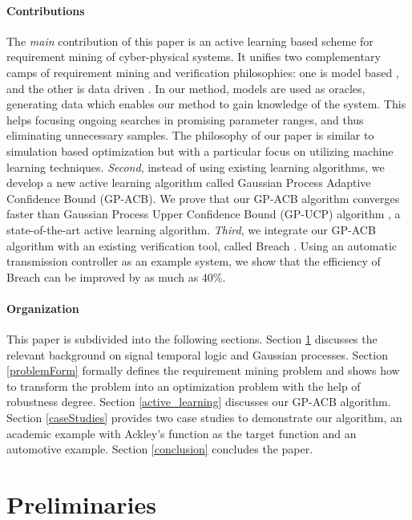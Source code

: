 \documentclass[10pt]{article}
\theoremstyle{plain}
\begin{document}
\paragraph{Contributions} The \emph{main} contribution of this paper is an active learning based scheme for requirement mining of cyber-physical systems. It unifies two complementary camps of requirement mining and verification philosophies: one is model based \cite{annpureddy2011s,abbas2013probabilistic,sankaranarayanan2012falsification,jin2013mining,asarin2012parametric}, and the other is data driven \cite{jones2014anomaly,kong2014temporal,bartocci2014data}. In our method, models are used as oracles, generating data which enables our method to gain knowledge of the system.  This helps focusing ongoing searches in promising parameter ranges, and thus eliminating unnecessary samples. The philosophy of our paper is similar to simulation based optimization \cite{gosavi2015simulation} but with a particular focus on utilizing machine learning techniques. \emph{Second}, instead of using existing learning algorithms, we develop a new active learning algorithm called Gaussian Process Adaptive Confidence Bound (GP-ACB). We prove that our GP-ACB algorithm converges faster than Gaussian Process Upper Confidence Bound (GP-UCP) algorithm \cite{srinivas2012information}, a state-of-the-art active learning algorithm. \emph{Third}, we integrate our GP-ACB algorithm with an existing verification tool, called Breach \cite{donze2010breach}. Using an automatic transmission controller as an example system, we show that the efficiency of Breach can be improved by as much as 40\%.

\paragraph{Organization} This paper is subdivided into the following sections. Section \ref{math} discusses the relevant background on signal temporal logic and Gaussian processes. Section \ref{problemForm} formally defines the requirement mining problem and shows how to transform the problem into an optimization problem with the help of robustness degree. Section \ref{active_learning} discusses our GP-ACB algorithm. Section \ref{caseStudies} provides two case studies to demonstrate our algorithm, an academic example with Ackley's function as the target function and an automotive example. Section \ref{conclusion} concludes the paper.


\section{Preliminaries}
\label{math}
\end{document}

